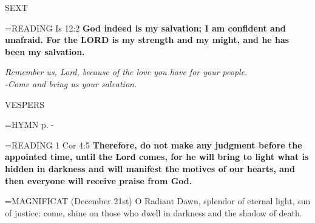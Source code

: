 \begin{flushleft}\normalsize SEXT\\\end{flushleft}

\hangindent=\parindent \small{\uppercase{READING}} Is 12:2 \textbf{God indeed is my salvation; I am confident and unafraid. For the LORD is my strength and my might, and he has been my salvation.\\}

\begin{center}
\textit{Remember us, Lord, because of the love you have for your people.\\
-Come and bring us your salvation.}
\end{center}

\begin{flushleft}\normalsize VESPERS\\\end{flushleft}

\hangindent=\parindent \small{\uppercase{HYMN} p. \pageref{advent:firstHymn}-\pageref{advent:lastHymn}\\}

\hangindent=\parindent \small{\uppercase{READING}} 1 Cor 4:5 \textbf{Therefore, do not make any judgment before the appointed time, until the Lord comes, for he will bring to light what is hidden in darkness and will manifest the motives of our hearts, and then everyone will receive praise from God.\\}

\hangindent=\parindent \small{MAGNIFICAT  (December 21st) O Radiant Dawn, splendor of eternal light, sun of justice: come, shine on those who dwell in darkness and the shadow of death.\\}
